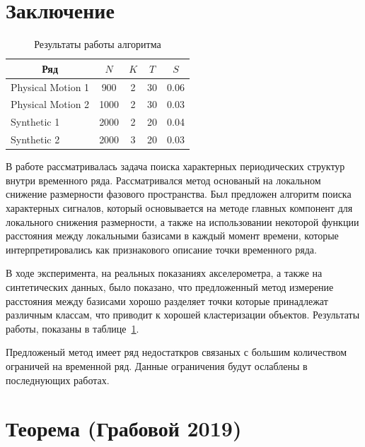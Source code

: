 \documentclass[12pt, twoside]{article}
\numberwithin{equation}{section}
\begin{document}
\section{Заключение}
\begin{table}[h!t]
\begin{center}
\caption{Результаты работы алгоритма}
\label{table_2}
\begin{tabular}{|c|c|c|c|c|}
\hline
	Ряд & $N$& $K$& $T$& $S$\\
	\hline
	\multicolumn{1}{|l|}{Physical Motion 1}
	& 900& 2& 30& 0.06\\
	\hline
	\multicolumn{1}{|l|}{Physical Motion 2}
	& 1000& 2& 30& 0.03\\
	\hline
	\multicolumn{1}{|l|}{Synthetic 1}
	& 2000& 2& 20& 0.04\\
	\hline
	\multicolumn{1}{|l|}{Synthetic 2}
	& 2000& 3& 20& 0.03\\
\hline

\end{tabular}
\end{center}
\end{table}

В работе рассматривалась задача поиска характерных периодических структур внутри временного ряда. Рассматривался метод основаный на локальном снижение размерности фазового пространства. Был предложен алгоритм поиска характерных сигналов, который основывается на методе главных компонент для локального снижения размерности, а также на использовании некоторой функции расстояния между локальными базисами в каждый момент времени, которые интерпретировались как признакового описание точки временного ряда.

В ходе эксперимента, на реальных показаниях акселерометра, а также на синтетических данных, было показано, что предложенный метод измерение расстояния между базисами хорошо разделяет точки которые принадлежат различным классам, что приводит к хорошей кластеризации объектов. Результаты работы, показаны в таблице~\ref{table_2}.

Предложеный метод имеет ряд недостаткров связаных с большим количеством ограничей на временной ряд. Данные ограничения будут ослаблены в последнующих работах.



\appendix
\section{Теорема (Грабовой 2019)}\label{ProofTheorem1}
\end{document}
